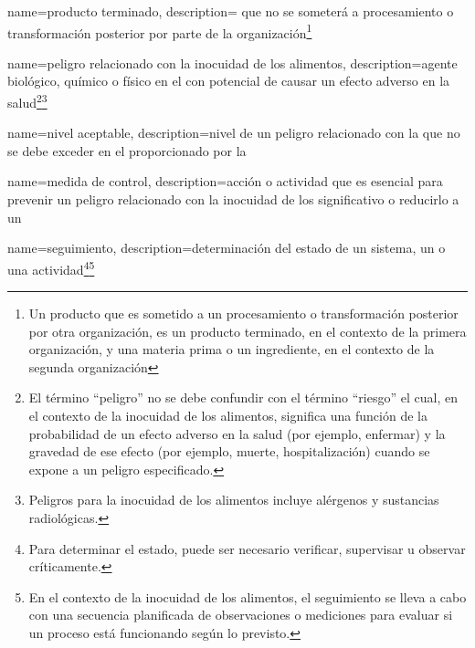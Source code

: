 {
    name=producto terminado,
    description={ que no se someterá a procesamiento o transformación posterior por parte de la organización\footnote{Un producto que es sometido a un procesamiento o transformación posterior por otra organización, es un producto terminado, en el contexto de la primera organización, y una materia prima o un ingrediente, en el contexto de la segunda organización}}
}

{
    name={peligro relacionado con la inocuidad de los alimentos},
    description={agente biológico, químico o físico en el  con potencial de causar un efecto adverso en la salud\footnote{El término “peligro” no se debe confundir con el término “riesgo” el cual, en el contexto de la inocuidad de los alimentos, significa una función de la probabilidad de un efecto adverso en la salud (por ejemplo, enfermar) y la gravedad de ese efecto (por ejemplo, muerte, hospitalización) cuando se expone a un peligro especificado.}\footnote{Peligros para la inocuidad de los alimentos incluye alérgenos y sustancias radiológicas.}}
}

{
    name={nivel aceptable},
    description={nivel de un peligro relacionado con la  que no se debe exceder en el  proporcionado por la }
}

{
    name={medida de control},
    description={acción o actividad que es esencial para prevenir un peligro relacionado con la inocuidad de los   significativo o reducirlo a un }
}

{
    name={seguimiento},
    description={determinación del estado de un sistema, un  o una actividad\footnote{Para determinar el estado, puede ser necesario verificar, supervisar u observar críticamente.}\footnote{En el contexto de la inocuidad de los alimentos, el seguimiento se lleva a cabo con una secuencia planificada de observaciones o mediciones para evaluar si un proceso está funcionando según lo previsto.}}
}


